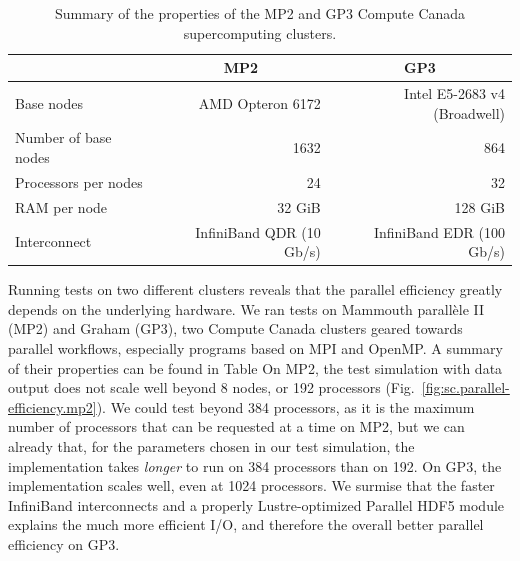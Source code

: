 \documentclass[11pt,SymmetricalJury]{inrsthesis/inrsthesis}
\begin{document}
\begin{table}
  \begin{tabular}{lrr}
  \toprule
                       & \multicolumn{1}{c}{MP2}   & \multicolumn{1}{c}{GP3}      \\
  \midrule
  Base nodes           & AMD Opteron 6172          & Intel E5-2683 v4 (Broadwell) \\
  Number of base nodes & 1632                      & 864                          \\
  Processors per nodes & 24                        & 32                           \\
  RAM per node         & 32 GiB                    & 128 GiB                      \\
  Interconnect         & InfiniBand QDR (10 Gb/s)  & InfiniBand EDR (100 Gb/s)    \\
  \bottomrule
  \end{tabular}
  \caption{Summary of the properties of the MP2 and GP3 Compute Canada supercomputing clusters.}
  \label{tab:sc.summary-of-cc-clusters}
\end{table}


Running tests on two different clusters reveals that the parallel efficiency
greatly depends on the underlying hardware. We ran tests on Mammouth parallèle II (MP2)
and Graham (GP3), two Compute Canada clusters geared towards parallel workflows,
especially programs based on MPI and OpenMP. A summary of their properties can be found
in Table On MP2, the test simulation
with data output does not scale well beyond 8 nodes, or 192 processors (Fig.~\ref{fig:sc.parallel-efficiency.mp2}).
We could test beyond 384 processors, as it is the maximum number of processors
that can be requested at a time on MP2, but we can already that, for the parameters
chosen in our test simulation, the implementation takes \textit{longer} to run
on 384 processors than on 192.
On GP3, the implementation scales well, even at 1024 processors. We surmise that
the faster InfiniBand interconnects and a properly Lustre-optimized Parallel HDF5
module explains the much more efficient I/O, and therefore the overall better parallel efficiency
on GP3.
\end{document}

